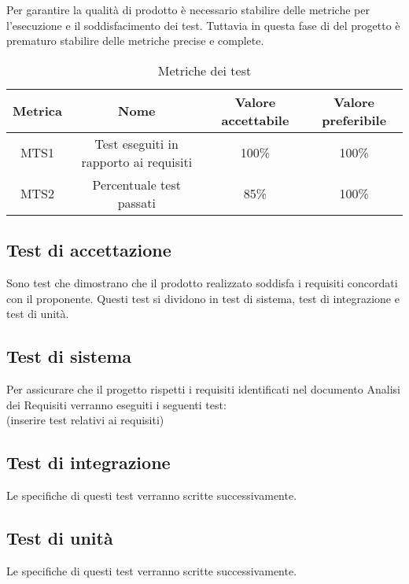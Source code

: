 \documentclass[../piano_di_qualifica.tex]{subfiles}
\begin{document}
Per garantire la qualità di prodotto è necessario stabilire delle metriche per l’esecuzione e il soddisfacimento dei test. Tuttavia in questa fase di del progetto è prematuro stabilire delle metriche precise e complete. 


\begin{table}[!ht]
\centering
\begin{tabular}{|c|c|c|c|}
		\hline
		\rowcolor{lightgray}
		\textbf{Metrica} & \textbf{Nome} &  \textbf{Valore accettabile} & \textbf{Valore preferibile} \\
		\hline 
		MTS1 & Test eseguiti in rapporto ai requisiti & 100\% & 100\% \\
 		\hline
		MTS2 & Percentuale test passati & 85\% & 100\% \\
		\hline
\end{tabular}
\caption{Metriche dei test}
\end{table}

\subsection{Test di accettazione}%
\label{sub:test_accett}
Sono test che dimostrano che il prodotto realizzato soddisfa i requisiti concordati con il proponente. 
Questi test si dividono in test di sistema, test di integrazione e test di unità.

\subsection{Test di sistema}%
\label{sub:test_sist}
Per assicurare che il progetto rispetti i requisiti identificati nel documento Analisi dei Requisiti verranno eseguiti i seguenti test: \\
(inserire test relativi ai requisiti)

\subsection{Test di integrazione}%
\label{sub:test_int}
Le specifiche di questi test verranno scritte successivamente.

\subsection{Test di unità}%
\label{sub:test_unit}
Le specifiche di questi test verranno scritte successivamente.
\end{document}
